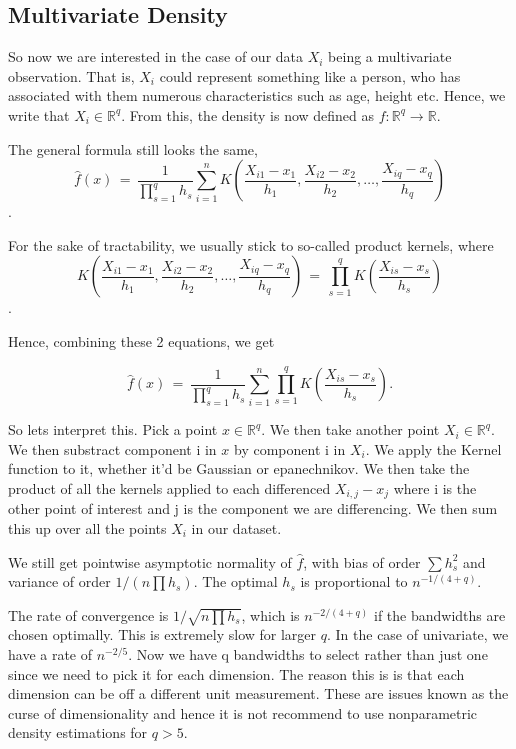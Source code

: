 \documentclass[twoside]{article}
\begin{document}
\subsection{Multivariate Density}
So now we are interested in the case of our data $X_i$ being a multivariate observation. That is, $X_i$ could represent something like a person, who has associated with them numerous characteristics such as age, height etc. Hence, we write that $X_i \in \mathbb{R}^q$. From this, the density is now defined as $f: \mathbb{R}^q \rightarrow \mathbb{R}$.

The general formula still looks the same, \[\hat{f}\left(x\right)\,=\,\frac{1}{\prod_{s=1}^qh_s}\sum_{i=1}^nK\left(\frac{X_{i1}-x_1}{h_1},\frac{X_{i2}-x_2}{h_2},\ldots,\frac{X_{iq}-x_q}{h_q}\right)\].

For the sake of tractability, we usually stick to so-called product kernels, where \[K\left(\frac{X_{i1}-x_1}{h_1},\frac{X_{i2}-x_2}{h_2},\ldots,\frac{X_{iq}-x_q}{h_q}\right)\,=\,\prod_{s=1}^qK\left(\frac{X_{is}-x_s}{h_s}\right)\].

Hence, combining these 2 equations, we get

\[\hat{f}\left(x\right)\,=\,\frac{1}{\prod_{s=1}^qh_s}\sum_{i=1}^n\prod_{s=1}^qK\left(\frac{X_{is}-x_s}{h_s}\right).\]

So lets interpret this. Pick a point $x \in \mathbb{R}^q$. We then take another point $X_i \in \mathbb{R}^q$. We then substract component i in $x$ by component i in $X_i$. We apply the Kernel function to it, whether it'd be Gaussian or epanechnikov. We then take the product of all the kernels applied to each differenced $X_{i,j} - x_j$ where i is the other point of interest and j is the component we are differencing. We then sum this up over all the points $X_i$ in our dataset.

We still get pointwise asymptotic normality of $\hat{f}$, with bias of order $\sum h_s^2$ and variance of order $1/\left(n\prod h_s\right)$. The optimal $h_s$ is proportional to $n^{-1/\left(4+q\right)}$.

The rate of convergence is $1/\sqrt{n\prod h_s}$, which is $n^{-2/\left(4+q\right)}$ if the bandwidths are chosen optimally. This is extremely slow for larger $q$. In the case of univariate, we have a rate of $n^{-2/5}$. Now we have q bandwidths to select rather than just one since we need to pick it for each dimension. The reason this is is that each dimension can be off a different unit measurement. These are issues known as the curse of dimensionality and hence it is not recommend to use nonparametric density estimations for $q > 5$.
\end{document}
